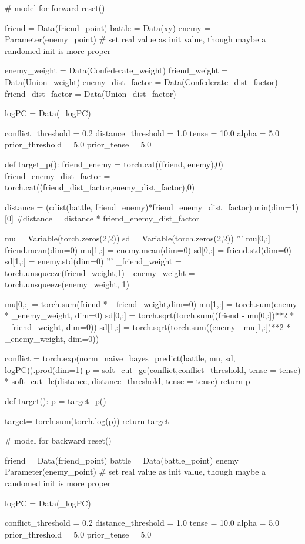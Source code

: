 \documentclass{article}
\begin{document}
\begin{python}
# model for forward
reset()

friend = Data(friend_point)
battle = Data(xy)
enemy = Parameter(enemy_point) # set real value as init value, though maybe a randomed init is more proper

enemy_weight = Data(Confederate_weight)
friend_weight = Data(Union_weight)
enemy_dist_factor = Data(Confederate_dist_factor)
friend_dist_factor = Data(Union_dist_factor)


logPC = Data(_logPC)

conflict_threshold = 0.2
distance_threshold = 1.0
tense = 10.0
alpha = 5.0
prior_threshold = 5.0
prior_tense = 5.0

def target_p():
    friend_enemy = torch.cat((friend, enemy),0)
    friend_enemy_dist_factor = torch.cat((friend_dist_factor,enemy_dist_factor),0)
    
    distance = (cdist(battle, friend_enemy)*friend_enemy_dist_factor).min(dim=1)[0]
    #distance = distance * friend_enemy_dist_factor

    mu = Variable(torch.zeros(2,2)) 
    sd = Variable(torch.zeros(2,2))
    '''
    mu[0,:] = friend.mean(dim=0)
    mu[1,:] = enemy.mean(dim=0)
    sd[0,:] = friend.std(dim=0)
    sd[1,:] = enemy.std(dim=0)
    '''
    _friend_weight = torch.unsqueeze(friend_weight,1)
    _enemy_weight  = torch.unsqueeze(enemy_weight, 1)
    
    mu[0,:] = torch.sum(friend * _friend_weight,dim=0)
    mu[1,:] = torch.sum(enemy  * _enemy_weight, dim=0)
    sd[0,:] = torch.sqrt(torch.sum((friend - mu[0,:])**2 * _friend_weight, dim=0))
    sd[1,:] = torch.sqrt(torch.sum((enemy  - mu[1,:])**2 * _enemy_weight, dim=0))
    
    conflict = torch.exp(norm_naive_bayes_predict(battle, mu, sd, logPC)).prod(dim=1)
    p = soft_cut_ge(conflict,conflict_threshold, tense = tense) * soft_cut_le(distance, distance_threshold, tense = tense)
    return p

def target():
    p = target_p()
    
    target= torch.sum(torch.log(p))
    return target
    
# model for backward
reset()

friend = Data(friend_point)
battle = Data(battle_point)
enemy = Parameter(enemy_point) # set real value as init value, though maybe a randomed init is more proper

logPC = Data(_logPC)

conflict_threshold = 0.2
distance_threshold = 1.0
tense = 10.0
alpha = 5.0
prior_threshold = 5.0
prior_tense = 5.0


\end{python}
\end{document}

